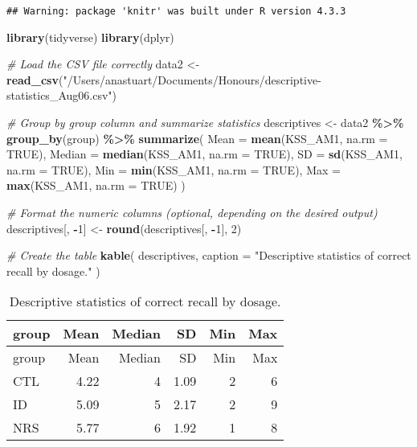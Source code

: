 \documentclass[
]{article}
\newenvironment{Shaded}{\begin{snugshade}}{\end{snugshade}}
\newcommand{\AttributeTok}[1]{\textcolor[rgb]{0.13,0.29,0.53}{#1}}
\newcommand{\CommentTok}[1]{\textcolor[rgb]{0.56,0.35,0.01}{\textit{#1}}}
\newcommand{\ConstantTok}[1]{\textcolor[rgb]{0.56,0.35,0.01}{#1}}
\newcommand{\DecValTok}[1]{\textcolor[rgb]{0.00,0.00,0.81}{#1}}
\newcommand{\FunctionTok}[1]{\textcolor[rgb]{0.13,0.29,0.53}{\textbf{#1}}}
\newcommand{\NormalTok}[1]{#1}
\newcommand{\OtherTok}[1]{\textcolor[rgb]{0.56,0.35,0.01}{#1}}
\newcommand{\SpecialCharTok}[1]{\textcolor[rgb]{0.81,0.36,0.00}{\textbf{#1}}}
\newcommand{\StringTok}[1]{\textcolor[rgb]{0.31,0.60,0.02}{#1}}
\begin{document}
\begin{verbatim}
## Warning: package 'knitr' was built under R version 4.3.3
\end{verbatim}

\begin{Shaded}
\begin{Highlighting}[]
\FunctionTok{library}\NormalTok{(tidyverse)}
\FunctionTok{library}\NormalTok{(dplyr)}

\CommentTok{\# Load the CSV file correctly}
\NormalTok{data2 }\OtherTok{\textless{}{-}} \FunctionTok{read\_csv}\NormalTok{(}\StringTok{"/Users/anastuart/Documents/Honours/descriptive{-}statistics\_Aug06.csv"}\NormalTok{)}

\CommentTok{\# Group by \textquotesingle{}group\textquotesingle{} column and summarize statistics}
\NormalTok{descriptives }\OtherTok{\textless{}{-}}\NormalTok{ data2 }\SpecialCharTok{\%\textgreater{}\%} 
  \FunctionTok{group\_by}\NormalTok{(group) }\SpecialCharTok{\%\textgreater{}\%} 
  \FunctionTok{summarize}\NormalTok{(}
    \AttributeTok{Mean =} \FunctionTok{mean}\NormalTok{(KSS\_AM1, }\AttributeTok{na.rm =} \ConstantTok{TRUE}\NormalTok{),}
    \AttributeTok{Median =} \FunctionTok{median}\NormalTok{(KSS\_AM1, }\AttributeTok{na.rm =} \ConstantTok{TRUE}\NormalTok{),}
    \AttributeTok{SD =} \FunctionTok{sd}\NormalTok{(KSS\_AM1, }\AttributeTok{na.rm =} \ConstantTok{TRUE}\NormalTok{),}
    \AttributeTok{Min =} \FunctionTok{min}\NormalTok{(KSS\_AM1, }\AttributeTok{na.rm =} \ConstantTok{TRUE}\NormalTok{),}
    \AttributeTok{Max =} \FunctionTok{max}\NormalTok{(KSS\_AM1, }\AttributeTok{na.rm =} \ConstantTok{TRUE}\NormalTok{)}
\NormalTok{  )}

\CommentTok{\# Format the numeric columns (optional, depending on the desired output)}
\NormalTok{descriptives[, }\SpecialCharTok{{-}}\DecValTok{1}\NormalTok{] }\OtherTok{\textless{}{-}} \FunctionTok{round}\NormalTok{(descriptives[, }\SpecialCharTok{{-}}\DecValTok{1}\NormalTok{], }\DecValTok{2}\NormalTok{)}

\CommentTok{\# Create the table}
\FunctionTok{kable}\NormalTok{(}
\NormalTok{  descriptives,}
  \AttributeTok{caption =} \StringTok{"Descriptive statistics of correct recall by dosage."}
\NormalTok{)}
\end{Highlighting}
\end{Shaded}

\begin{longtable}[]{@{}lrrrrr@{}}
\caption{Descriptive statistics of correct recall by
dosage.}\tabularnewline
\toprule\noalign{}
group & Mean & Median & SD & Min & Max \\
\midrule\noalign{}
\endfirsthead
\toprule\noalign{}
group & Mean & Median & SD & Min & Max \\
\midrule\noalign{}
\endhead
\bottomrule\noalign{}
\endlastfoot
CTL & 4.22 & 4 & 1.09 & 2 & 6 \\
ID & 5.09 & 5 & 2.17 & 2 & 9 \\
NRS & 5.77 & 6 & 1.92 & 1 & 8 \\
\end{longtable}
\end{document}

